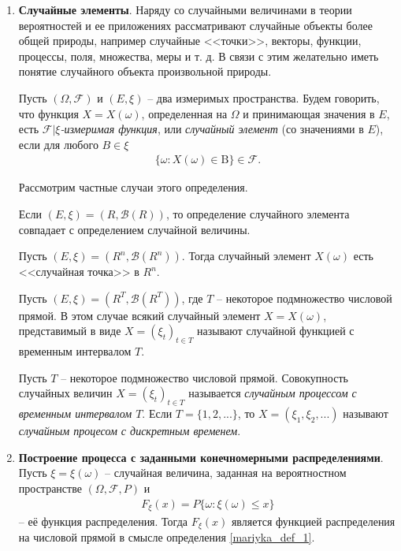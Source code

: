 \begin{enumerate}
\item \textbf{Случайные элементы}. Наряду со случайными величинами в теории вероятностей и ее приложениях рассматривают случайные объекты более общей природы, например случайные <<точки>>, векторы, функции, процессы, поля, множества, меры и т. д. В связи с этим желательно иметь понятие случайного объекта произвольной природы.

\begin{definition}\label{mariyka_def_3} Пусть $(\Omega, \mathcal{F})$ и $(E, \xi)$ -- два измеримых пространства. Будем говорить, что функция $X = X(\omega)$, определенная на $\Omega$ и принимающая значения в $E$, есть $\mathcal{F}|\xi$\textit{-измеримая функция}, или \textit{случайный элемент} (со значениями в $E$), если для любого $B \in \xi$ 
\begin{align*}
\{\omega: X(\omega) \in \text{B}\} \in \mathcal{F}.
\end{align*}
\end{definition}
Рассмотрим частные случаи этого определения.

Если $(E, \xi) = (R, \mathcal{B}(R))$, то определение случайного элемента совпадает с определением случайной величины. 

Пусть $(E, \xi) = (R^n, \mathcal{B}(R^n))$. Тогда случайный элемент $X(\omega)$ есть <<случайная точка>> в $R^n$. 

Пусть $(E, \xi) = (R^{T}, \mathcal{B}(R^T))$, где $T$ -- некоторое подмножество числовой прямой. В этом случае всякий случайный элемент $X = X(\omega)$, представимый в виде $X = (\xi_t)_{t \in T}$ называют случайной функцией с временным интервалом $T$. 

\begin{definition}\label{mariyka_def_4} Пусть $T$ -- некоторое подмножество числовой прямой. Совокупность случайных величин $X = (\xi_t)_{t \in T}$ называется \textit{случайным процессом с временным интервалом $T$}. Если $T = \{1,2, ...\}$, то $X = (\xi_1, \xi_2 , ...)$ называют \textit{случайным процесом с дискретным временем}. 
\end{definition}

\item \textbf{Построение процесса с заданными конечномерными распределениями}. Пусть $\xi = \xi(\omega)$ -- случайная величина, заданная на вероятностном пространстве $(\Omega, \mathcal{F}, P)$ и 
\begin{align*}
F_{\xi} (x) = P\{\omega: \xi(\omega) \leq x\} 
\end{align*}
-- её функция распределения. Тогда $F_{\xi} (x)$ является функцией распределения на числовой прямой в смысле определения \ref{mariyka_def_1}.


\end{enumerate}
